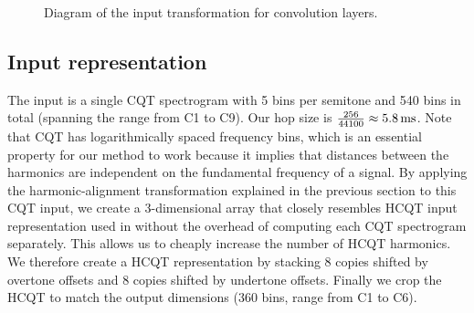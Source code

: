 \documentclass{article}
\begin{document}
\begin{figure}
 \centerline{}
 \caption{Diagram of the input transformation for convolution layers.}
 \label{fig:hcnn_transform}
\end{figure}

\subsection{Input representation}

The input is a single CQT spectrogram with 5 bins per semitone and 540 bins in total (spanning the range from C1 to C9). Our hop size is $\frac{256}{44100} \approx 5.8\,\rm ms$. Note that CQT has logarithmically spaced frequency bins, which is an essential property for our method to work because it implies that distances between the harmonics are independent on the fundamental frequency of a signal. By applying the harmonic-alignment transformation explained in the previous section to this CQT input, we create a 3-dimensional array that closely resembles HCQT input representation used in \cite{Bittner2017} without the overhead of computing each CQT spectrogram separately. This allows us to cheaply increase the number of HCQT harmonics. We therefore create a HCQT representation by stacking 8 copies shifted by overtone offsets and 8 copies shifted by undertone offsets. Finally we crop the HCQT to match the output dimensions (360 bins, range from C1 to C6).
\end{document}
